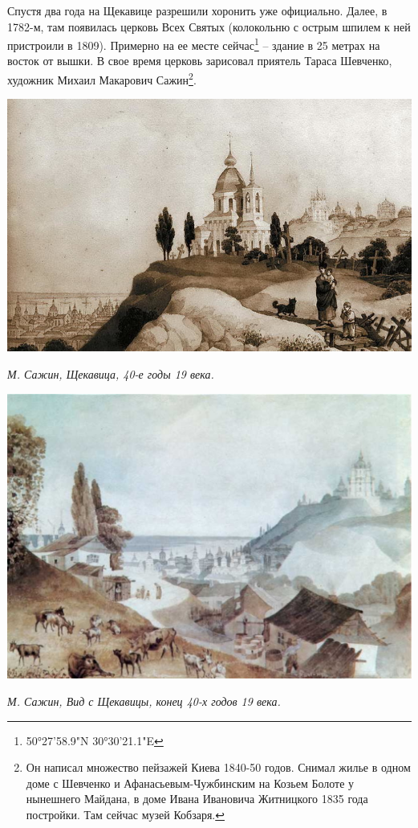Спустя два года на Щекавице разрешили хоронить уже официально. Далее, в 1782-м, там появилась церковь Всех Святых (колокольню с острым шпилем к ней пристроили в 1809). Примерно на ее месте сейчас\footnote{50°27'58.9"N 30°30'21.1"E} – здание в 25 метрах на восток от вышки. В свое время церковь зарисовал приятель Тараса Шевченко, художник Михаил Макарович Сажин\footnote{Он написал множество пейзажей Киева 1840-50 годов. Снимал жилье в одном доме с Шевченко и Афанасьевым-Чужбинским на Козьем Болоте у нынешнего Майдана, в доме Ивана Ивановича Житницкого 1835 года постройки. Там сейчас музей Кобзаря.}.

\newpage
\vspace*{\fill}
\begin{center}
\includegraphics[width=\textwidth]{chast-colebanie-osnov/sheka/shekavica-sajin.jpg}

\textit{М. Сажин, Щекавица, 40-е годы 19 века.}
\end{center}


\begin{center}
\includegraphics[width=\linewidth]{chast-colebanie-osnov/sheka/sajin-vid-s-shekavici.jpg}

\textit{М. Сажин, Вид с Щекавицы, конец 40-х годов 19 века.}
\end{center}
\vspace*{\fill}
\newpage

